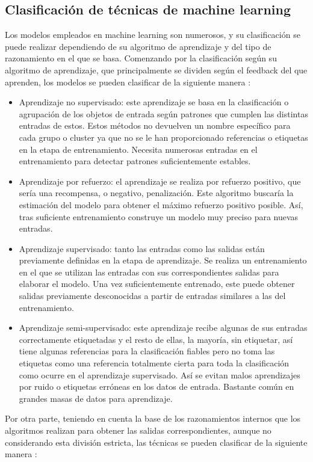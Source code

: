 \subsection{Clasificación de técnicas de machine learning}
\par Los modelos empleados en machine learning son numerosos, y su clasificación se puede realizar dependiendo de su algoritmo de aprendizaje y del tipo de razonamiento en el que se basa. Comenzando por la clasificación según su algoritmo de aprendizaje, que principalmente se dividen según el feedback  del que aprenden, los modelos se pueden clasificar de la siguiente manera \cite{MLRussell}: 
\begin{itemize}
	\item Aprendizaje no supervisado: este aprendizaje se basa en la clasificación o agrupación de los objetos de entrada según patrones que cumplen las distintas entradas de estos. Estos métodos no devuelven un nombre específico para cada grupo o cluster ya que no se le han proporcionado referencias o etiquetas en la etapa de entrenamiento. Necesita numerosas entradas en el entrenamiento para detectar patrones suficientemente estables. 
	\item Aprendizaje por refuerzo: el aprendizaje se realiza por refuerzo positivo, que sería una recompensa, o negativo, penalización. Este algoritmo buscaría la estimación del modelo para obtener el máximo refuerzo positivo posible. Así, tras suficiente entrenamiento construye un modelo muy preciso para nuevas entradas. 
	\item Aprendizaje supervisado: tanto las entradas como las salidas están previamente definidas en la etapa de aprendizaje. Se realiza un entrenamiento en el que se utilizan las entradas con sus correspondientes salidas para elaborar el modelo. Una vez suficientemente entrenado, este puede obtener salidas previamente desconocidas a partir de entradas similares a las del entrenamiento. 
	\item Aprendizaje semi-supervisado: este aprendizaje recibe algunas de sus entradas correctamente etiquetadas y el resto de ellas, la mayoría, sin etiquetar, así tiene algunas referencias para la clasificación fiables pero no toma las etiquetas como una referencia totalmente cierta para toda la clasificación como ocurre en el aprendizaje supervisado. Así se evitan malos aprendizajes por ruido o etiquetas erróneas en los datos de entrada. Bastante común en grandes masas de datos para aprendizaje. 
\end{itemize}
\par Por otra parte, teniendo en cuenta la base de los razonamientos internos que los algoritmos realizan para obtener las salidas correspondientes, aunque no considerando esta división estricta, las técnicas se pueden clasificar de la siguiente manera \cite{MLFlach}:
